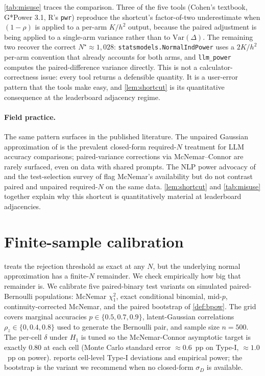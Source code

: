 \documentclass{article}
\theoremstyle{plain}
\theoremstyle{definition}
\begin{document}
\cref{tab:misuse} traces the comparison. Three of the five tools (Cohen's textbook, G*Power 3.1, R's \texttt{pwr}) reproduce the shortcut's factor-of-two underestimate when $(1{-}\rho)$ is applied to a per-arm $K/h^2$ output, because the paired adjustment is being applied to a single-arm variance rather than to $\mathrm{Var}(\Delta)$. The remaining two recover the correct $N^{\star} \approx 1{,}028$: \texttt{statsmodels.NormalIndPower} uses a $2K/h^2$ per-arm convention that already accounts for both arms, and \texttt{llm\_power} computes the paired-difference variance directly. This is not a calculator-correctness issue: every tool returns a defensible quantity. It is a user-error pattern that the tools make easy, and \cref{lem:shortcut} is its quantitative consequence at the leaderboard adjacency regime.

\paragraph{Field practice.} The same pattern surfaces in the published literature. The unpaired Gaussian approximation of \citet{miller2024errorbars} is the prevalent closed-form required-$N$ treatment for LLM accuracy comparisons; paired-variance corrections via McNemar--Connor are rarely surfaced, even on data with shared prompts. The NLP power advocacy of \citet{card2020little} and the test-selection survey of \citet{dror2018hitchhiker} flag McNemar's availability but do not contrast paired and unpaired required-$N$ on the same data. \cref{lem:shortcut} and \cref{tab:misuse} together explain why this shortcut is quantitatively material at leaderboard adjacencies.

\section{Finite-sample calibration}
\label{sec:calib}

 treats the rejection threshold as exact at any $N$, but the underlying normal approximation has a finite-$N$ remainder. We check empirically how big that remainder is. We calibrate five paired-binary test variants on simulated paired-Bernoulli populations: McNemar $\chi^2_1$, exact conditional binomial, mid-$p$, continuity-corrected McNemar, and the paired bootstrap of \cref{def:bpow}. The grid covers marginal accuracies $p\in\{0.5,0.7,0.9\}$, latent-Gaussian correlations $\rho_z\in\{0,0.4,0.8\}$ used to generate the Bernoulli pair, and sample size $n{=}500$. The per-cell $\delta$ under $H_1$ is tuned so the McNemar-Connor asymptotic target is exactly $0.80$ at each cell (Monte Carlo standard error ${\approx}0.6$~pp on Type-I, ${\approx}1.0$~pp on power).  reports cell-level Type-I deviations and empirical power; the bootstrap is the variant we recommend when no closed-form $\sigma_D$ is available.
\end{document}
